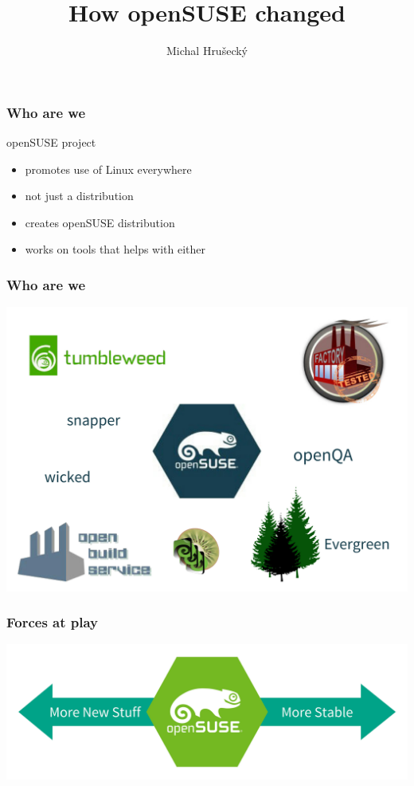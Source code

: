 \documentclass{beamer}
\author{Michal Hru\v{s}eck\'{y}\newline {\small openSUSE Board}}
\title{How openSUSE changed}
\begin{document}
\begin{frame}[t,plain]
\titlepage
\end{frame}


\begin{frame}[t]
\frametitle{Who are we}
openSUSE project
\begin{itemize}
\item promotes use of Linux everywhere
\item not just a distribution
\item creates openSUSE distribution
\item works on tools that helps with either
\end{itemize}
\end{frame}

\begin{frame}
\frametitle{Who are we}
\begin{center}
\includegraphics[width=.75\paperwidth]{projects}
\end{center}
\end{frame}


\begin{frame}[t]
\frametitle{Forces at play}
\begin{center}
\vspace{1cm}
\includegraphics[width=.8\paperwidth]{forces}
\end{center}
\end{frame}
\end{document}
